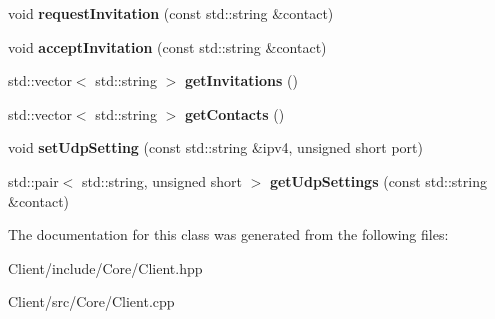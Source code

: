 \begin{DoxyCompactItemize}
\mbox{\label{classbbl_1_1cli_1_1_client_af2df5e5c39d2d109a3a0efdc7db110b8}} 
void {\bfseries request\+Invitation} (const std\+::string \&contact)
\item 
\mbox{\label{classbbl_1_1cli_1_1_client_affd3e03b029a61eb0a090cdc059538ec}} 
void {\bfseries accept\+Invitation} (const std\+::string \&contact)
\item 
\mbox{\label{classbbl_1_1cli_1_1_client_a1a53802b4412dbb0373e56258b91daab}} 
std\+::vector$<$ std\+::string $>$ {\bfseries get\+Invitations} ()
\item 
\mbox{\label{classbbl_1_1cli_1_1_client_ae87912ca10ad9f26abeeccc41f24712f}} 
std\+::vector$<$ std\+::string $>$ {\bfseries get\+Contacts} ()
\item 
\mbox{\label{classbbl_1_1cli_1_1_client_a293eae6663d07bd1d95a04a49b712bfb}} 
void {\bfseries set\+Udp\+Setting} (const std\+::string \&ipv4, unsigned short port)
\item 
\mbox{\label{classbbl_1_1cli_1_1_client_aa3bb631819f71fd2f0423dd6dc410068}} 
std\+::pair$<$ std\+::string, unsigned short $>$ {\bfseries get\+Udp\+Settings} (const std\+::string \&contact)
\end{DoxyCompactItemize}


The documentation for this class was generated from the following files\+:\begin{DoxyCompactItemize}
\item 
Client/include/\+Core/Client.\+hpp\item 
Client/src/\+Core/Client.\+cpp\end{DoxyCompactItemize}
